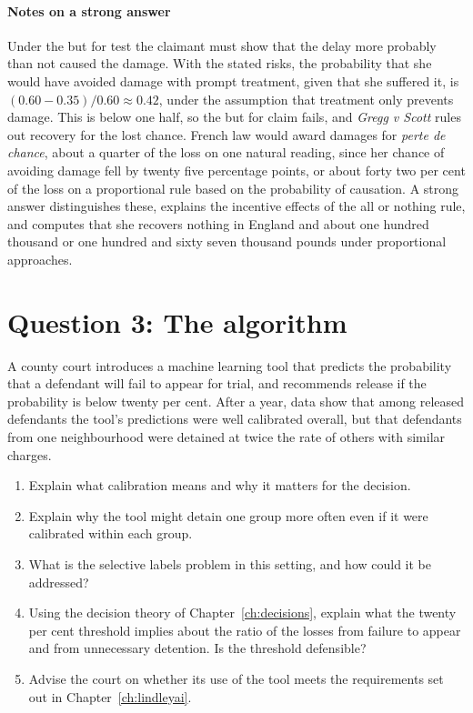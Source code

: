 \paragraph{Notes on a strong answer} Under the but for test the claimant must show that the delay more probably than not caused the damage. With the stated risks, the probability that she would have avoided damage with prompt treatment, given that she suffered it, is $(0.60 - 0.35)/0.60 \approx 0.42$, under the assumption that treatment only prevents damage. This is below one half, so the but for claim fails, and \emph{Gregg v Scott} rules out recovery for the lost chance. French law would award damages for \emph{perte de chance}, about a quarter of the loss on one natural reading, since her chance of avoiding damage fell by twenty five percentage points, or about forty two per cent of the loss on a proportional rule based on the probability of causation. A strong answer distinguishes these, explains the incentive effects of the all or nothing rule, and computes that she recovers nothing in England and about one hundred thousand or one hundred and sixty seven thousand pounds under proportional approaches.

\section*{Question 3: The algorithm}
A county court introduces a machine learning tool that predicts the probability that a defendant will fail to appear for trial, and recommends release if the probability is below twenty per cent. After a year, data show that among released defendants the tool's predictions were well calibrated overall, but that defendants from one neighbourhood were detained at twice the rate of others with similar charges.

\begin{enumerate}[label=(\alph*)]
\item Explain what calibration means and why it matters for the decision.
\item Explain why the tool might detain one group more often even if it were calibrated within each group.
\item What is the selective labels problem in this setting, and how could it be addressed?
\item Using the decision theory of Chapter~\ref{ch:decisions}, explain what the twenty per cent threshold implies about the ratio of the losses from failure to appear and from unnecessary detention. Is the threshold defensible?
\item Advise the court on whether its use of the tool meets the requirements set out in Chapter~\ref{ch:lindleyai}.
\end{enumerate}

